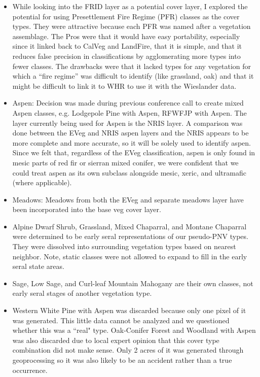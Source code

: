 \begin{itemize}
\item While looking into the FRID layer as a potential cover layer, I explored the potential for using Presettlement Fire Regime (PFR) classes as the cover types. They were attractive because each PFR was named after a vegetation assemblage. The Pros were that it would have easy portability, especially since it linked back to CalVeg and LandFire, that it is simple, and that it reduces false precision in classifications by agglomerating more types into fewer classes. The drawbacks were that it lacked types for any vegetation for which a ``fire regime'' was difficult to identify (like grassland, oak) and that it might be difficult to link it to WHR to use it with the Wieslander data.

\item Aspen: Decision was made during previous conference call to create mixed Aspen classes, e.g. Lodgepole Pine with Aspen, RFWFJP with Aspen. The layer currently being used for Aspen is the NRIS layer. A comparison was done between the EVeg and NRIS aspen layers and the NRIS appears to be more complete and more accurate, so it will be solely used to identify aspen. Since we felt that, regardless of the EVeg classification, aspen is only found in mesic parts of red fir or sierran mixed conifer, we were confident that we could treat aspen as its own subclass alongside mesic, xeric, and ultramafic (where applicable).

\item Meadows: Meadows from both the EVeg and separate meadows layer have been incorporated into the base veg cover layer.

\item Alpine Dwarf Shrub, Grassland, Mixed Chaparral, and Montane Chaparral were determined to be early seral representations of our pseudo-PNV types. They were dissolved into surrounding vegetation types based on nearest neighbor. Note, static classes were not allowed to expand to fill in the early seral state areas.

\item Sage, Low Sage, and Curl-leaf Mountain Mahogany are their own classes, not early seral stages of another vegetation type. 

\item Western White Pine with Aspen was discarded because only one pixel of it was generated. This little data cannot be analyzed and we questioned whether this was a ``real" type. Oak-Conifer Forest and Woodland with Aspen was also discarded due to local expert opinion that this cover type combination did not make sense. Only 2 acres of it was generated through geoprocessing so it was also likely to be an accident rather than a true occurrence.

\end{itemize}


